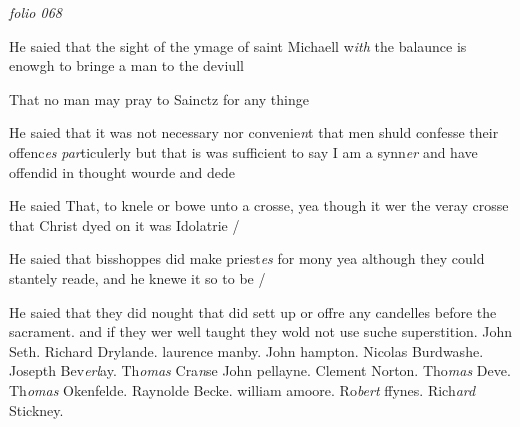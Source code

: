 \documentclass[12pt, a4paper]{book}
\begin{document}
\textit{folio 068}



	
			
	
		\ifthenelse{\isodd{\thepage}}
		{\reversemarginpar}
		{\normalmarginpar}
		He saied that the sight of the ymage of saint
 Michaell w\textit{ith} the balaunce is enowgh to
 bringe a man to the deviull
 
 	
			
 	
		\ifthenelse{\isodd{\thepage}}
		{\reversemarginpar}
		{\normalmarginpar}
		That no man may pray to Sainctz for any thinge
 
 
 	
			
 	
		\ifthenelse{\isodd{\thepage}}
		{\reversemarginpar}
		{\normalmarginpar}
		He saied that it was not necessary nor convenie\textit{n}t
 that men shuld confesse their offenc\textit{es}
                  \textit{par}ticulerly
 but that is was sufficient to say I am a synn\textit{er}
 and have offendid in thought wourde and dede
 

			
	
		\ifthenelse{\isodd{\thepage}}
		{\reversemarginpar}
		{\normalmarginpar}
		He saied That, to knele or bowe unto a crosse,
 yea though it wer the veray crosse that Christ
 dyed on it was Idolatrie /
 
 	
				\marginpar[\vspace{0.5cm}{\textcolor{Gray}{seditious}}]{}
			
 	
		\ifthenelse{\isodd{\thepage}}
		{\reversemarginpar}
		{\normalmarginpar}
		He saied that bisshoppes did make priest\textit{es} for mony
 yea although they could stantely reade, and he
 knewe it so to be /

	
				\marginpar[\vspace{0.5cm}{\textcolor{Gray}{candelles}}]{}
			
	
		\ifthenelse{\isodd{\thepage}}
		{\reversemarginpar}
		{\normalmarginpar}
		He saied that they did nought that did sett up or
 offre any candelles before the sacrament. and if
 they wer well taught they wold not use suche
 superstition. John Seth. Richard Drylande. laurence manby.
		John hampton. Nicolas Burdwashe. Josepth Bev\textit{erl}ay. Th\textit{omas} Cra\textit{n}se
 	John pellayne. Clement Norton. Tho\textit{mas} Deve. Th\textit{omas} Okenfelde.
		Raynolde Becke. william amoore. Ro\textit{bert }ffynes. Rich\textit{ard} Stickney.
			
\end{document}
